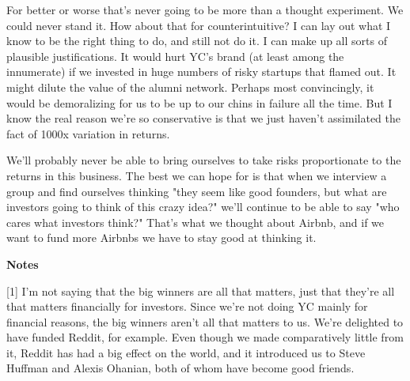 For
                    better or worse that's never going to be more than a thought
                    experiment. We could never stand it. How about that for
                    counterintuitive? I can lay out what I know to be the right
                    thing to do, and still not do it. I can make up all sorts of
                    plausible justifications. It would hurt YC's brand (at least
                    among the innumerate) if we invested in huge numbers of
                    risky startups that flamed out. It might dilute the value of
                    the alumni network. Perhaps most convincingly, it would be
                    demoralizing for us to be up to our chins in failure all the
                    time. But I know the real reason we're so conservative is
                    that we just haven't assimilated the fact of 1000x variation
                    in returns.

We'll probably never be able to bring
                    ourselves to take risks proportionate to the returns in this
                    business. The best we can hope for is that when we interview
                    a group and find ourselves thinking "they seem like good
                    founders, but what are investors going to think of this
                    crazy idea?" we'll continue to be able to say "who cares
                    what investors think?" That's what we thought about Airbnb,
                    and if we want to fund more Airbnbs we have to stay good at
                    thinking it.





\textbf{Notes}

[1] I'm not saying that the big winners are all that matters,
                    just that they're all that matters financially for
                    investors. Since we're not doing YC mainly for financial
                    reasons, the big winners aren't all that matters to us.
                    We're delighted to have funded Reddit, for example. Even
                    though we made comparatively little from it, Reddit has had
                    a big effect on the world, and it introduced us to Steve
                    Huffman and Alexis Ohanian, both of whom have become good
                    friends.

